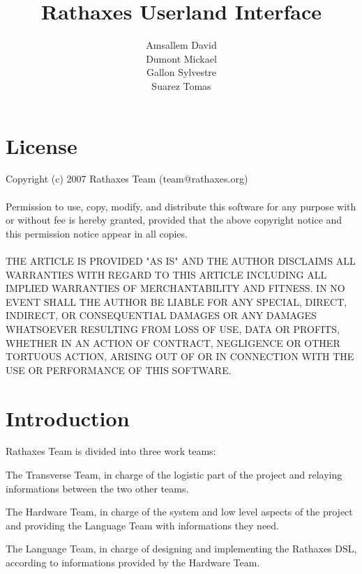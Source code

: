 \documentclass[11pt]{report}
\begin{document}
\author{Amsallem David\\Dumont Mickael\\Gallon Sylvestre\\Suarez Tomas}
\title{Rathaxes Userland Interface}
\maketitle

\section*{License}
Copyright (c) 2007 Rathaxes Team (team@rathaxes.org)
\\\\
Permission to use, copy, modify, and distribute this software for any
purpose with or without fee is hereby granted, provided that the above
copyright notice and this permission notice appear in all copies.
\\\\
THE ARTICLE IS PROVIDED "AS IS" AND THE AUTHOR DISCLAIMS ALL WARRANTIES
WITH REGARD TO THIS ARTICLE INCLUDING ALL IMPLIED WARRANTIES OF
MERCHANTABILITY AND FITNESS. IN NO EVENT SHALL THE AUTHOR BE LIABLE FOR
ANY SPECIAL, DIRECT, INDIRECT, OR CONSEQUENTIAL DAMAGES OR ANY DAMAGES
WHATSOEVER RESULTING FROM LOSS OF USE, DATA OR PROFITS, WHETHER IN AN
ACTION OF CONTRACT, NEGLIGENCE OR OTHER TORTUOUS ACTION, ARISING OUT OF
OR IN CONNECTION WITH THE USE OR PERFORMANCE OF THIS SOFTWARE.
\newpage

\section*{Introduction}

Rathaxes Team is divided into three work teams:\\
\begin{description}
  \item{The Transverse Team, in charge of the logistic part of the project and
    relaying informations between the two other teams.}
  \item{The Hardware Team, in charge of the system and low level aspects of the
    project and providing the Language Team with informations they need.}
  \item{The Language Team, in charge of designing and implementing the Rathaxes
    DSL, according to informations provided by the Hardware Team.\\}
\end{description}
\end{document}
